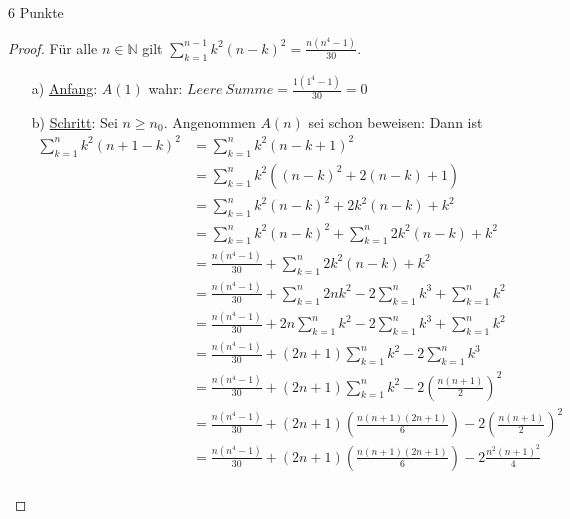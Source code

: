\documentclass{problemset}
\begin{document}
\begin{problem}[Summenformeln]{6 Punkte}
\begin{proof}
	Für alle $n \in \mathbb{N}$ gilt $\sum_{k = 1}^{n - 1} k^2(n - k)^2 = \frac{n(n^4 - 1)}{30}$.
	\begin{enumerate}
		\item[a)] \underline{Anfang}: $A(1)$ wahr: $Leere\ Summe = \frac{1(1^4 - 1)}{30} = 0$
		\item[b)] \underline{Schritt}: Sei $n \ge n_0$. Angenommen $A(n)$ sei schon beweisen: Dann ist
		      \begin{align}
			      \sum_{k = 1}^{n} k^2(n + 1 - k)^2 & = \sum_{k = 1}^{n} k^2(n - k + 1)^2                                                                       \\
			                                        & = \sum_{k = 1}^{n} k^2((n - k)^2 + 2(n-k)+ 1)                                                             \\
			                                        & = \sum_{k = 1}^{n} k^2(n - k)^2 + 2k^2(n-k) + k^2                                                         \\
			                                        & = \sum_{k = 1}^{n} k^2(n - k)^2 + \sum_{k=1}^{n} 2k^2(n-k) + k^2                                          \\
			                                        & = \frac{n(n^4 - 1)}{30} + \sum_{k=1}^{n} 2k^2(n-k) + k^2                                                  \\
			                                        & = \frac{n(n^4 - 1)}{30} + \sum_{k=1}^{n} 2nk^2 - 2\sum_{k=1}^{n} k^3 + \sum_{k=1}^{n} k^2                 \\
			                                        & = \frac{n(n^4 - 1)}{30} + 2n\sum_{k=1}^{n} k^2 - 2\sum_{k=1}^{n} k^3 + \sum_{k=1}^{n} k^2                 \\
			                                        & = \frac{n(n^4 - 1)}{30} + (2n+1)\sum_{k=1}^{n} k^2 - 2\sum_{k=1}^{n} k^3 \tag{aus 1.a}                    \\
			                                        & = \frac{n(n^4 - 1)}{30} + (2n+1)\sum_{k=1}^{n} k^2 - 2\left(\frac{n(n+1)}{2}\right)^2 \tag{aus Vorlesung} \\
			                                        & = \frac{n(n^4 - 1)}{30} + (2n+1)\left(\frac{n(n+1)(2n+1)}{6}\right) - 2\left(\frac{n(n+1)}{2}\right)^2    \\
			                                        & = \frac{n(n^4 - 1)}{30} + (2n+1)\left(\frac{n(n+1)(2n+1)}{6}\right) - 2\frac{n^2(n+1)^2}{4}               \\

\end{align}
\end{enumerate}
\end{proof}
\end{problem}
\end{document}
